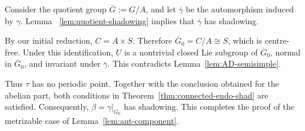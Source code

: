 \documentclass[12pt]{amsart}
\theoremstyle{definition}
\numberwithin{equation}{section}
\theoremstyle{remark}
\begin{document}
Consider the quotient group $\overline G:=G/A$, and let
$\overline\gamma$ be the automorphism induced by $\gamma$.  Lemma~
\ref{lem:quotient-shadowing} implies that $\overline\gamma$ has
shadowing.

By our initial reduction, $C=A\times S$. Therefore
$\overline G_0=C/A\cong S$, which is centre-free. Under this
identification, $U$ is a nontrivial closed Lie subgroup of
$\overline G_0$, normal in $\overline G_0$, and invariant under
$\overline\gamma$. This contradicts Lemma~\ref{lem:AD-semisimple}.

Thus $\tau$ has no periodic point. Together with the conclusion
obtained for the abelian part, both conditions in
Theorem~\ref{thm:connected-endo-shad} are satisfied. Consequently,
$\beta=\gamma|_{G_0}$ has shadowing. This completes the proof of the
metrizable case of Lemma~\ref{lem:aut-component}.
\end{document}
